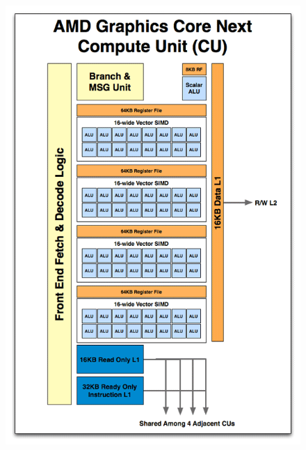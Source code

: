 \documentclass[10pt, compress]{beamer}
\begin{document}
{\begin{minipage}{0.475\textwidth}
    \begin{figure}[htpb]
        \centering
        \includegraphics[scale=0.25]{Core-AMD-GCN}
        \label{fig:Core-AMD-GCN}
    \end{figure}
\end{minipage}
}

\end{document}
